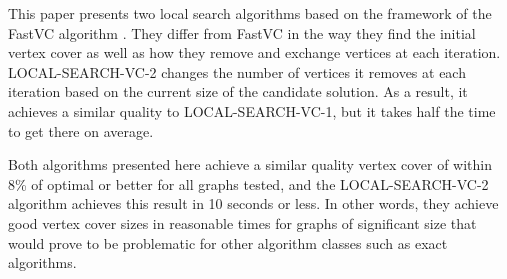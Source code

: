 \documentclass[sigconf]{acmart}
\begin{document}
This paper presents two local search algorithms based on the framework of the FastVC algorithm \cite{cai2015fastvc}. They differ from FastVC in the way they find the initial vertex cover as well as how they remove and exchange vertices at each iteration. LOCAL-SEARCH-VC-2 changes the number of vertices it removes at each iteration based on the current size of the candidate solution. As a result, it achieves a similar quality to LOCAL-SEARCH-VC-1, but it takes half the time to get there on average.

Both algorithms presented here achieve a similar quality vertex cover of within 8\% of optimal or better for all graphs tested, and the LOCAL-SEARCH-VC-2 algorithm achieves this result in 10 seconds or less. In other words, they achieve good vertex cover sizes in reasonable times for graphs of significant size that would prove to be problematic for other algorithm classes such as exact algorithms.


 
\end{document}
